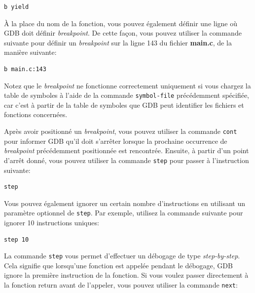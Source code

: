 \documentclass[11pt]{article}
\begin{document}
\begin{lstlisting}[language=sh,numbers=none,frame=single]
b yield
\end{lstlisting}

\vspace{0.3cm}
À la place du nom de la fonction, vous pouvez également définir une ligne
où GDB doit définir \textit {breakpoint}. De cette façon, vous pouvez
utiliser la commande suivante pour définir un \textit {breakpoint}
sur la ligne 143 du fichier \textbf {main.c}, de la manière suivante: \\

\begin{lstlisting}[language=sh,numbers=none,frame=single]
b main.c:143
\end{lstlisting}

\vspace{0.3cm}
Notez que le \textit {breakpoint} ne fonctionne correctement uniquement
si vous chargez la table de symboles à l'aide de la commande
\texttt{symbol-file} précédemment spécifiée, car c'est à partir de la table
de symboles que GDB peut identifier les fichiers et fonctions concernées.

Après avoir positionné un \textit {breakpoint}, vous pouvez utiliser la
commande \texttt {cont} pour informer GDB qu'il doit s'arrêter lorsque
la prochaine occurrence de \textit {breakpoint} précédemment positionnée
est rencontrée. Ensuite, à partir d'un point d'arrêt donné, vous pouvez
utiliser la commande \texttt {step} pour passer à l'instruction suivante: \\

\begin{lstlisting}[language=sh,numbers=none,frame=single]
step
\end{lstlisting}

\vspace{0.3cm}
Vous pouvez également ignorer un certain nombre d'instructions en utilisant un paramètre optionnel de \texttt {step}. Par exemple, utilisez la commande suivante pour ignorer 10 instructions uniques: \\

\begin{lstlisting}[language=sh,numbers=none,frame=single]
step 10
\end{lstlisting}

\vspace{0.3cm}
La commande \texttt {step} vous permet d'effectuer un débogage de type \textit {step-by-step}. Cela signifie que lorsqu'une fonction est appelée pendant le
débogage, GDB ignore la première instruction de la fonction. Si vous voulez
passer directement à la fonction return avant de l'appeler, vous pouvez
utiliser la commande \texttt {next}: \\
\end{document}
